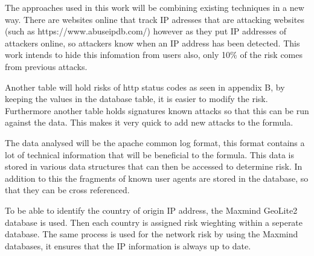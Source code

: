 The approaches used in this work will be combining existing techniques in a new way. There are websites online that track IP adresses that are attacking websites (such as https://www.abuseipdb.com/) however as they put IP addresses of attackers online, so attackers know when an IP address has been detected. This work intends to hide this infomation from users also, only 10\% of the risk comes from previous attacks.

Another table will hold risks of http status codes as  seen in appendix B, by keeping the values in the database table, it is easier to modify the risk. Furthermore another table holds signatures known attacks so that this can be run against the data. This makes it very quick to add new attacks to the formula.

The data analysed will be the apache common log format, this format contains a lot of technical information that will be beneficial to the formula. This data is stored in various data structures that can then be accessed to determine risk. In addition to this the fragments of known user agents are stored in the database, so that they can be cross referenced.  

To be able to identify the country of origin IP address, the Maxmind GeoLite2 database is used. Then each country is assigned risk wieghting within a seperate database. The same process is used for the network risk by using the Maxmind databases, it ensures that the IP information is always up to date.